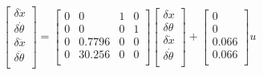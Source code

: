 \documentclass[a4paper,12pt]{article}
\begin{document}
\begin{equation}\label{linearized}
    \begin{bmatrix}
        \delta \dot x\\
        \delta \dot \theta\\
        \delta \ddot x\\
        \delta \ddot \theta\\
    \end{bmatrix}
    =
    \begin{bmatrix}
        0 & 0 & 1 & 0 \\
        0 & 0 & 0 & 1 \\
        0 & 0.7796 & 0 & 0\\
        0 & 30.256 & 0 & 0\\
    \end{bmatrix}
    \begin{bmatrix}
        \delta x\\
        \delta \theta\\
        \delta \dot x\\
        \delta \dot \theta\\
    \end{bmatrix}
    +
    \begin{bmatrix}
        0\\
        0\\
        0.066\\
        0.066\\
    \end{bmatrix}
    u
\end{equation}
\end{document}
